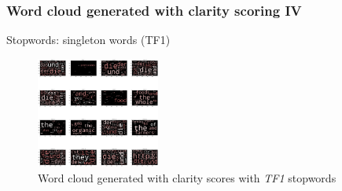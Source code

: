 \documentclass{tum-presentation}
\begin{document}
\begin{frame}
  \frametitle{Word cloud generated with clarity scoring IV}
  Stopwords: singleton words (TF1)
  \begin{center}
    \begin{figure}[t]
      \includegraphics[width=0.36\textwidth]{images/tf1_wordcloud.png}
      \caption{Word cloud generated with clarity scores with \emph{TF1} stopwords}
    \end{figure}
  \end{center}
\end{frame}
\end{document}
